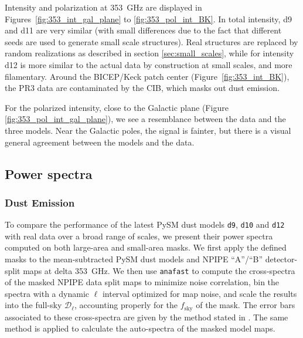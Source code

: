 \documentclass[twocolumn]{aastex631}
\begin{document}
Intensity and polarization at 353~GHz are displayed in Figures~\ref{fig:353_int_gal_plane} to \ref{fig:353_pol_int_BK}. 
In total intensity, d9 and d11 are very similar (with small differences due to the fact that different seeds are used to generate small scale structures). Real structures are replaced by random realizations as described in section \ref{sec:small_scales}, while for intensity d12 is more similar to the actual data by construction at small scales, and more filamentary. 
Around the BICEP/Keck patch center (Figure~\ref{fig:353_int_BK}), the PR3 data are contaminated by the CIB, which masks out dust emission. 

For the polarized intensity, close to the Galactic plane (Figure \ref{fig:353_pol_int_gal_plane}), we see a resemblance between the data and the three models. Near the Galactic poles, the signal is fainter, but there is a visual general agreement between the models and the data. 
\subsection{Power spectra}
\label{sec:PS-validation}

\subsubsection{Dust Emission}

To compare the performance of the latest PySM dust models \texttt{d9}, \texttt{d10} and \texttt{d12} with real data over a broad range of scales, we present their power spectra computed on both large-area and small-area masks. We first apply the defined masks to the mean-subtracted PySM dust models and NPIPE ``A''/``B'' detector-split maps at delta 353~GHz. We then use \texttt{anafast} to compute the cross-spectra of the masked NPIPE data split maps to minimize noise correlation, bin the spectra with a dynamic $\ell$ interval optimized for map noise, and scale the results into the full-sky $\mathcal{D}_\ell$, accounting properly for the $f_{\mathrm{sky}}$ of the mask. The error bars associated to these cross-spectra are given by the method stated in \cite{Tristram:2005}. The same method is applied to calculate the auto-spectra of the masked model maps. 

\end{document}
